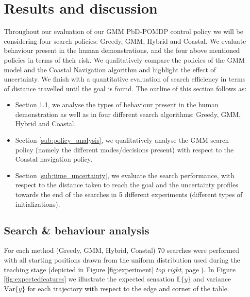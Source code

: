 \section{Results and discussion}\label{chap3:results}

Throughout our evaluation of our GMM PbD-POMDP control policy we will be considering four search policies: Greedy, GMM, Hybrid and 
Coastal. We evaluate behaviour present in the human demonstrations, and the four above mentioned policies in terms 
of their risk. We qualitatively compare the policies of the GMM model and the Coastal Navigation algorithm and highlight the 
effect of uncertainty. We finish with a quantitative evaluation of search efficiency in terms of distance travelled until the goal is found.
The outline of this section follows as:
\begin{itemize}
 \item Section \ref{sub:search_behaviour}, we analyse the types of behaviour present in the human demonstration as well as in
four different search algorithms: Greedy, GMM, Hybrid and Coastal.
 \item Section \ref{sub:policy_analysis}, we qualitatively analyse the GMM search policy (namely the different modes/decisions present) 
 with respect to the Coastal navigation policy.
 \item Section \ref{sub:time_uncertainty}, we evaluate the search performance, with respect to the distance taken to reach the goal and the uncertainty profiles towards the end of 
the searches in 5 different experiments (different types of initializations). 
\end{itemize}
\FloatBarrier
\subsection{Search \& behaviour analysis}\label{sub:search_behaviour}

For each method (Greedy, GMM, Hybrid, Coastal) 70 searches were performed with all starting positions drawn from the
uniform distribution used during the teaching stage (depicted in Figure \ref{fig:experiment} \textit{top right}, page \pageref{fig:experiment}). 
In Figure \ref{fig:expectedfeatures} we illustrate the expected sensation $\mathbb{E}\{y\}$ and  variance $\mathrm{Var}\{y\}$ for each trajectory with respect 
to the edge and corner of the table. 

